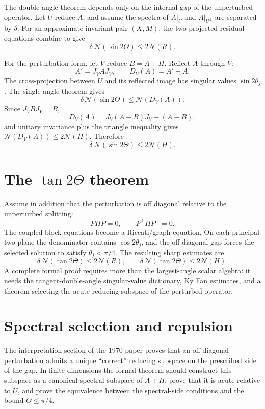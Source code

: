 \documentclass[11pt]{article}
\newcommand{\Nn}{\mathcal N}
\theoremstyle{remark}
\begin{document}
The double-angle theorem depends only on the internal gap of the unperturbed
operator.  Let \(U\) reduce \(A\), and assume the spectra of
\(A|_U\) and \(A|_{U^\perp}\) are separated by \(\delta\).  For an approximate
invariant pair \((X,M)\), the two projected residual equations combine to give
\[
  \delta\,\Nn(\sin 2\Theta)\le 2\Nn(R).
\]

For the perturbation form, let \(V\) reduce \(B=A+H\).  Reflect \(A\) through
\(V\):
\[
  A'=J_VAJ_V,\qquad D_V(A)=A'-A.
\]
The cross-projection between \(U\) and its reflected image has singular values
\(\sin 2\theta_j\).  The single-angle theorem gives
\[
  \delta\,\Nn(\sin 2\Theta)\le\Nn(D_V(A)).
\]
Since \(J_VBJ_V=B\),
\[
  D_V(A)=J_V(A-B)J_V-(A-B),
\]
and unitary invariance plus the triangle inequality gives
\(\Nn(D_V(A))\le2\Nn(H)\).  Therefore
\[
  \delta\,\Nn(\sin 2\Theta)\le2\Nn(H).
\]

\section{The \texorpdfstring{$\tan 2\Theta$}{tan 2 Theta} theorem}

Assume in addition that the perturbation is off diagonal relative to the
unperturbed splitting:
\[
  PHP=0,\qquad P^\perp H P^\perp=0.
\]
The coupled block equations become a Riccati/graph equation.  On each principal
two-plane the denominator contains \(\cos 2\theta_j\), and the off-diagonal gap
forces the selected solution to satisfy \(\theta_j<\pi/4\).  The resulting
sharp estimates are
\[
  \delta\,\Nn(\tan 2\Theta)\le2\Nn(R),
  \qquad
  \delta\,\Nn(\tan 2\Theta)\le2\Nn(H).
\]
A complete formal proof requires more than the largest-angle scalar algebra:
it needs the tangent-double-angle singular-value dictionary, Ky Fan estimates,
and a theorem selecting the acute reducing subspace of the perturbed operator.

\section{Spectral selection and repulsion}

The interpretation section of the 1970 paper proves that an off-diagonal
perturbation admits a unique ``correct'' reducing subspace on the prescribed
side of the gap.  In finite dimensions the formal theorem should construct this
subspace as a canonical spectral subspace of \(A+H\), prove that it is acute
relative to \(U\), and prove the equivalence between the spectral-side
conditions and the bound \(\Theta\le\pi/4\).
\end{document}
